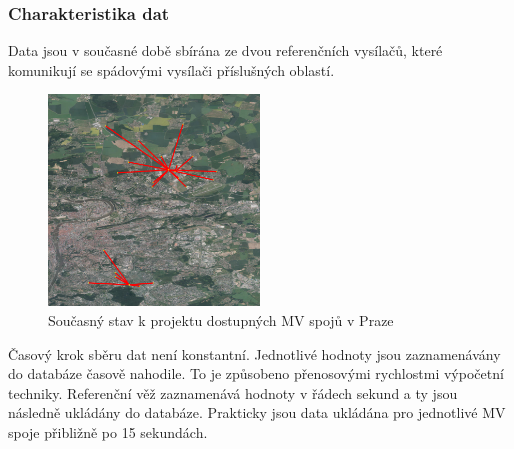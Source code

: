 \documentclass[a4paper,12pt,oneside]{report}
\begin{document}
\subsubsection*{ Charakteristika dat} Data jsou v současné době sbírána ze dvou referenčních vysílačů, které komunikují se spádovými vysílači příslušných oblastí. 

\begin{figure}[h!]
    \centering
    \includegraphics[width=0.5\textwidth]{./img/letnany.png}
    \caption[Snapshot model]{Současný stav k projektu dostupných MV spojů v Praze  \centering  }
        \label{fig:snapshot}
 \end{figure} 
Časový krok sběru dat není konstantní. Jednotlivé hodnoty jsou zaznamenávány do databáze časově nahodile. To je způsobeno přenosovými rychlostmi výpočetní techniky.  Referenční věž zaznamenává hodnoty v řádech sekund a ty jsou následně ukládány do databáze. Prakticky jsou data ukládána pro jednotlivé MV spoje přibližně po 15 sekundách. 


\end{document}

